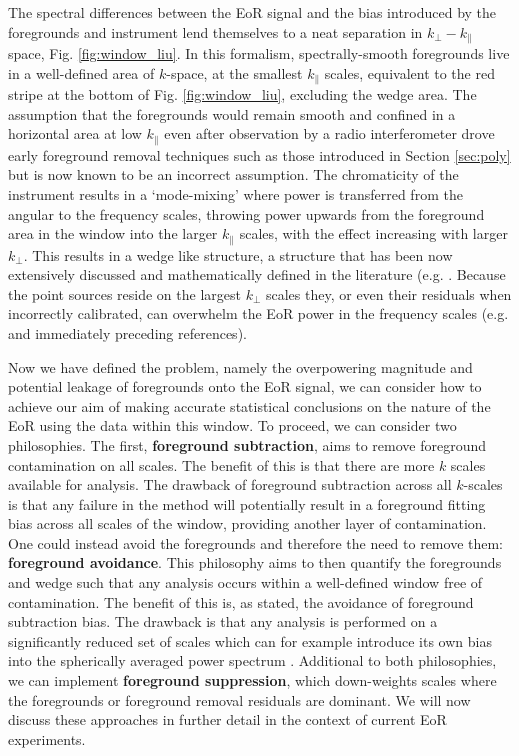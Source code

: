 The spectral differences between the EoR signal and the bias introduced by the foregrounds and instrument lend themselves to a neat separation in $k_\bot-k_\parallel$ space, Fig. \ref{fig:window_liu}. In this formalism, spectrally-smooth foregrounds live in a well-defined area of $k$-space, at the smallest $k_\parallel$ scales, equivalent to the red stripe at the bottom of Fig. \ref{fig:window_liu}, excluding the wedge area. The assumption that the foregrounds would remain smooth and confined in a horizontal area at low $k_\parallel$ even after observation by a radio interferometer drove early foreground removal techniques such as those introduced in Section \ref{sec:poly} but is now known to be an incorrect assumption. The chromaticity of the instrument results in a `mode-mixing' where power is transferred from the angular to the frequency scales, throwing power upwards from the foreground area in the window into the larger $k_\parallel$ scales, with the effect increasing with larger $k_\bot$. This results in a wedge like structure, a structure that has been now extensively discussed and mathematically defined in the literature (e.g. \citep{Jensen2016MNRAS.456...66J,Dillon2014PhRvD..89b3002D,Liu2014PhRvD..90b3019L,Liu2014PhRvD..90b3018L,Hazelton2013ApJ...770..156H,Thyagarajan2013ApJ...776....6T,Pober2013ApJ...768L..36P,Morales2012ApJ...752..137M,Vedantham2012ApJ...745..176V,Trott2012ApJ...757..101T,Parsons2012ApJ...756..165P,Datta2010ApJ...724..526D}. Because the point sources reside on the largest $k_\bot$ scales they, or even their residuals when incorrectly calibrated, can overwhelm the EoR power in the frequency scales (e.g. \citep{Bowman2009ApJ...695..183B} and immediately preceding references).

Now we have defined the problem, namely the overpowering magnitude and potential leakage of foregrounds onto the EoR signal, we can consider how to achieve our aim of making accurate statistical conclusions on the nature of the EoR using the data within this window. To proceed, we can consider two philosophies. The first, \textbf{foreground subtraction}, aims to remove foreground contamination on all scales. The benefit of this is that there are more $k$ scales available for analysis. The drawback of foreground subtraction across all $k$-scales is that any failure in the method will potentially result in a foreground fitting bias across all scales of the window, providing another layer of contamination. One could instead avoid the foregrounds and therefore the need to remove them: \textbf{foreground avoidance}. This philosophy aims to then quantify the foregrounds and wedge such that any analysis occurs within a well-defined window free of contamination. The benefit of this is, as stated, the avoidance of foreground subtraction bias. The drawback is that any analysis is performed on a significantly reduced set of scales which can for example introduce its own bias into the spherically averaged power spectrum \citep{Jensen2016MNRAS.456...66J}. Additional to both philosophies, we can implement \textbf{foreground suppression}, which down-weights scales where the foregrounds or foreground removal residuals are dominant. We will now discuss these approaches in further detail in the context of current EoR experiments.

